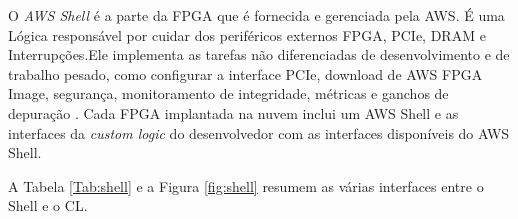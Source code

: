 O \textit{AWS Shell} é a parte da FPGA que é fornecida e gerenciada pela AWS. É uma Lógica responsável por cuidar dos periféricos externos FPGA, PCIe, DRAM e Interrupções.Ele  implementa as tarefas não diferenciadas de desenvolvimento e de trabalho pesado, como configurar a interface PCIe, download de AWS FPGA Image, segurança, monitoramento de integridade, métricas e ganchos de depuração \cite{awsfaq}. Cada FPGA implantada na nuvem inclui um AWS Shell e as interfaces da \textit{custom logic} do desenvolvedor com as interfaces disponíveis do AWS Shell.

A Tabela \ref{Tab:shell} e a Figura \ref{fig:shell}  resumem as várias interfaces entre o Shell e o CL.



\begin{figure}[H] 
   	    \captionsetup{width=15cm}%
\end{figure}


